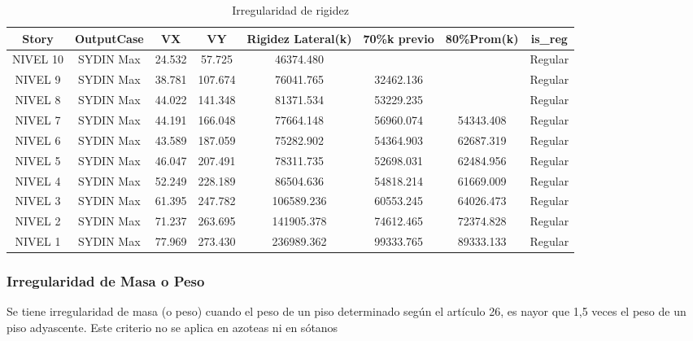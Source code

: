 \documentclass{article}%
\begin{document}
\begin{table}[h!]%
\centering%
\caption{Irregularidad de rigidez}%
\begin{tabular}{cccccccc}
\toprule
Story & OutputCase & VX & VY & Rigidez Lateral(k) & 70\%k previo & 80\%Prom(k) & is\_reg \\
\midrule
NIVEL 10 & SYDIN Max & 24.532 & 57.725 & 46374.480 &  &  & Regular \\
NIVEL 9 & SYDIN Max & 38.781 & 107.674 & 76041.765 & 32462.136 &  & Regular \\
NIVEL 8 & SYDIN Max & 44.022 & 141.348 & 81371.534 & 53229.235 &  & Regular \\
NIVEL 7 & SYDIN Max & 44.191 & 166.048 & 77664.148 & 56960.074 & 54343.408 & Regular \\
NIVEL 6 & SYDIN Max & 43.589 & 187.059 & 75282.902 & 54364.903 & 62687.319 & Regular \\
NIVEL 5 & SYDIN Max & 46.047 & 207.491 & 78311.735 & 52698.031 & 62484.956 & Regular \\
NIVEL 4 & SYDIN Max & 52.249 & 228.189 & 86504.636 & 54818.214 & 61669.009 & Regular \\
NIVEL 3 & SYDIN Max & 61.395 & 247.782 & 106589.236 & 60553.245 & 64026.473 & Regular \\
NIVEL 2 & SYDIN Max & 71.237 & 263.695 & 141905.378 & 74612.465 & 72374.828 & Regular \\
NIVEL 1 & SYDIN Max & 77.969 & 273.430 & 236989.362 & 99333.765 & 89333.133 & Regular \\
\bottomrule
\end{tabular}
%
\end{table}

%
\subsubsection{Irregularidad de Masa o Peso}%
\label{ssubsec:IrregularidaddeMasaoPeso}%
\begin{tcolorbox}[colback=gray!5!white,colframe=cyan!75!black,fonttitle=\bfseries,title=Tabla N°9 E-030]%
Se tiene irregularidad de masa (o peso) cuando el peso de un piso determinado según el artículo 26, es nayor que 1,5 veces el peso de un piso adyascente. Este criterio no se aplica en azoteas ni en sótanos%
\end{tcolorbox}%
\end{document}
